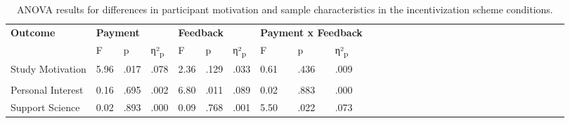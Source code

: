 \documentclass[authordate, empirical,issue]{jote-new-article}
\begin{document}
\pagebreak

\begin{table}[t]
  \begin{fullwidth}


    \caption{ANOVA results for differences in participant motivation and sample characteristics in the incentivization scheme conditions.}
    \centering
    \begin{tabular}{@{} l l l l l l l l l l l l l l l l l l l l l l l l l l l l l l @{}}
      \hline \textbf{Outcome} & \multicolumn{3}{l}{\textbf{Payment}}            & \multicolumn{3}{l}{\textbf{Feedback}}
                              & \multicolumn{3}{l}{\textbf{Payment x Feedback}}                                                                                                                                        \\

                              & F                                               & p                                     & η²\textsubscript{p} & F     & p    & η²\textsubscript{p} & F    & p    & η²\textsubscript{p}
      \\

      \hline Study Motivation & 5.96                                            & .017                                  & .078                & 2.36  & .129 & .033                & 0.61 &
      .436                    & .009                                                                                                                                                                                   \\

                              &                                                 &                                       &                     &       &      &                     &      &      &                     \\

      Personal Interest       & 0.16                                            & .695                                  & .002                & 6.80  & .011 & .089                & 0.02 & .883
                              & .000                                                                                                                                                                                   \\

      Support Science         & 0.02                                            & .893                                  & .000                & 0.09  & .768 & .001                & 5.50 & .022 &
      .073                                                                                                                                                                                                             \\


\end{tabular}
\end{fullwidth}
\end{table}
\end{document}
